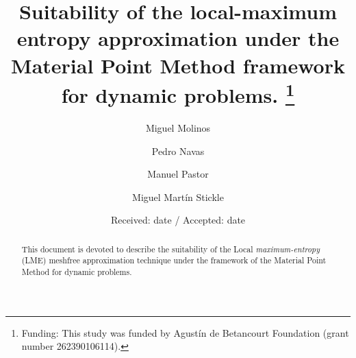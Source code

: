\newcommand{\Div}[1]{
  \ensuremath{\nabla \cdot {#1}}
}
\newcommand{\Grad}[1]{
  \ensuremath{\nabla{#1}}
}

\newcommand{\Deriv}[3][]{
  \ensuremath{\frac{\partial^{#1}{#2}}{ \partial {#3}^{#1} }}
}

\newcommand{\Integral}[2]{
  \IfStrEqCase{#1}{
    {1}{\ensuremath{\int_{\Gamma}{#2}\ d\Gamma}}
    {2}{\ensuremath{\int_{\Sigma}{#2}\ d\Sigma}}
    {3}{\ensuremath{\int_{\Omega}{#2}\ d\Omega}}
  }
}

%
%


\title{Suitability of the local-maximum entropy approximation under
  the Material Point Method framework for dynamic problems. \thanks{Funding: This
    study was funded by Agustín de Betancourt Foundation (grant number
    262390106114).}
}


\author{Miguel Molinos \and
  Pedro Navas \and
  Manuel Pastor \and
  Miguel Martín Stickle
}




\date{Received: date / Accepted: date}

\maketitle
\begin{abstract}
  This document is devoted to describe the suitability of the Local
  \textit{maximum-entropy} (LME) meshfree approximation technique under the framework of the
  Material Point Method for dynamic problems. 
\end{abstract}

